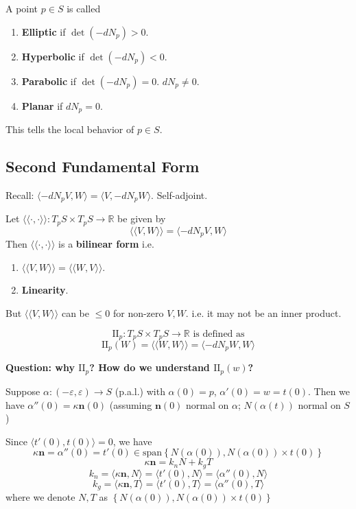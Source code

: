 \documentclass{article}
\begin{document}
\begin{definition}
A point $p \in S$ is called
\begin{enumerate}
    \item \textbf{Elliptic} if $\det(-dN_p) > 0$.
    \item \textbf{Hyperbolic} if $\det(-dN_p) < 0$.
    \item \textbf{Parabolic} if $\det(-dN_p) = 0$. $dN_p \ne 0$.
    \item \textbf{Planar} if $dN_p = 0$.
\end{enumerate}
This tells the local behavior of $p \in S$.
\end{definition}

\subsection{Second Fundamental Form}
\begin{remark}
Recall: $\langle -dN_p V, W \rangle = \langle V, -dN_p W \rangle$. Self-adjoint.
\end{remark}

\begin{definition}
Let $\langle\langle \cdot, \cdot \rangle\rangle : T_p S \times T_p S \to \mathbb{R}$ be given by
$$ \langle\langle V, W \rangle\rangle = \langle -dN_p V, W \rangle $$
Then $\langle\langle \cdot, \cdot \rangle\rangle$ is a \textbf{bilinear form} i.e.
\begin{enumerate}
    \item $\langle\langle V, W \rangle\rangle = \langle\langle W, V \rangle\rangle$.
    \item \textbf{Linearity}.
\end{enumerate}
But $\langle\langle V, W \rangle\rangle$ can be $\le 0$ for non-zero $V, W$.
i.e. it may not be an inner product.
\end{definition}

\begin{definition}
$$ \mathrm{II}_p: T_p S \times T_p S \to \mathbb{R} \text{ is defined as} $$
$$ \mathrm{II}_p(W) = \langle\langle W, W \rangle\rangle = \langle -dN_p W, W \rangle $$
\end{definition}

\textbf{Question: why $\mathrm{II}_p$? How do we understand $\mathrm{II}_p(w)$?}

\begin{remark}
Suppose $\alpha: (-\varepsilon, \varepsilon) \to S$  (p.a.l.) with $\alpha(0) = p$, $\alpha'(0) = w = t(0)$.
Then we have $\alpha''(0) = \kappa \mathbf{n}(0)$
(assuming $\mathbf{n}(0)$ normal on $\alpha$; $N(\alpha(t))$ normal on $S$)

Since $\langle t'(0), t(0) \rangle = 0$, we have
$$ \kappa \mathbf{n} = \alpha''(0) = t'(0) \in \text{span} \left\{ N(\alpha(0)), N(\alpha(0)) \times t(0) \right\} $$
$$ \kappa \mathbf{n} = k_n N + k_g T $$
$$ k_n = \langle \kappa \mathbf{n}, N \rangle = \langle t'(0), N \rangle = \langle \alpha''(0), N \rangle $$
$$ k_g = \langle \kappa \mathbf{n}, T \rangle = \langle t'(0), T \rangle = \langle \alpha''(0), T \rangle $$
where we denote $N,T$ as $\left\{ N(\alpha(0)), N(\alpha(0)) \times t(0) \right\}$
\end{remark}
\end{document}
